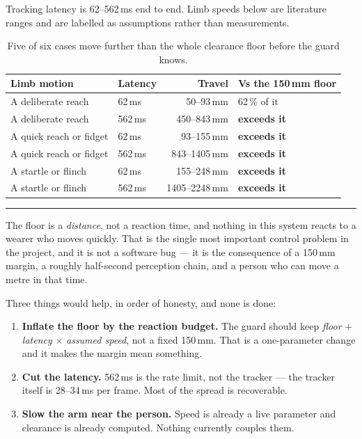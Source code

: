 \documentclass[11pt,a4paper,oneside]{report}
\newcommand{\keyfact}[1]{%
  \par\vspace{7pt}\noindent
  \hspace*{0pt}\textcolor{srlblue}{\rule{2.5pt}{\dimexpr\baselineskip\relax}}%
  \hspace{9pt}%
  \begin{minipage}[t]{\dimexpr\textwidth-14pt\relax}
  \small #1
  \end{minipage}\par\vspace{7pt}}
\begin{document}
Tracking latency is 62--562\,ms end to end. Limb speeds below are literature
ranges and are labelled as assumptions rather than measurements.

\begin{table}[H]
\centering
\small
\begin{tabular}{@{}llrl@{}}
\toprule
\textbf{Limb motion} & \textbf{Latency} & \textbf{Travel} & \textbf{Vs the 150\,mm floor} \\
\midrule
A deliberate reach & 62\,ms & 50--93\,mm & 62\,\% of it \\
A deliberate reach & 562\,ms & 450--843\,mm & \textbf{exceeds it} \\
A quick reach or fidget & 62\,ms & 93--155\,mm & \textbf{exceeds it} \\
A quick reach or fidget & 562\,ms & 843--1405\,mm & \textbf{exceeds it} \\
A startle or flinch & 62\,ms & 155--248\,mm & \textbf{exceeds it} \\
A startle or flinch & 562\,ms & 1405--2248\,mm & \textbf{exceeds it} \\
\bottomrule
\end{tabular}
\caption{Five of six cases move further than the whole clearance floor before
the guard knows.}
\end{table}

\keyfact{The floor is a \emph{distance}, not a reaction time, and nothing in
this system reacts to a wearer who moves quickly. That is the single most
important control problem in the project, and it is not a software bug --- it is
the consequence of a 150\,mm margin, a roughly half-second perception chain, and
a person who can move a metre in that time.}

Three things would help, in order of honesty, and none is done:

\begin{enumerate}
\item \textbf{Inflate the floor by the reaction budget.} The guard should keep
      \emph{floor} $+$ \emph{latency} $\times$ \emph{assumed speed}, not a fixed
      150\,mm. That is a one-parameter change and it makes the margin mean
      something.
\item \textbf{Cut the latency.} 562\,ms is the rate limit, not the tracker ---
      the tracker itself is 28--34\,ms per frame. Most of the spread is
      recoverable.
\item \textbf{Slow the arm near the person.} Speed is already a live parameter
      and clearance is already computed. Nothing currently couples them.
\end{enumerate}
\end{document}
